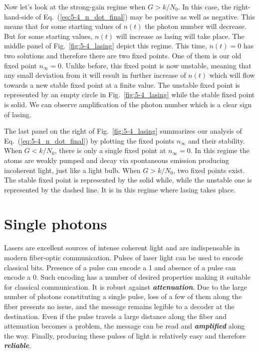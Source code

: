 Now let's look at the strong-gain regime when $G > k / N_0$.
In this case, the right-hand-side of Eq.~(\ref{eq:5-4_n_dot_final}) may be positive as well as negative.
This means that for some starting values of $n(t)$ the photon number will decrease.
But for some starting values, $n(t)$ will increase as lasing will take place.
The middle panel of Fig.~\ref{fig:5-4_lasing} depict this regime.
This time, $\dot{n}(t) = 0$ has two solutions and therefore there are two fixed points.
One of them is our old fixed point $n_{\infty} = 0$.
Unlike before, this fixed point is now unstable, meaning that any small deviation from it will result in further increase of $n(t)$ which will flow towards a new stable fixed point at a finite value.
The unstable fixed point is represented by an empty circle in Fig.~\ref{fig:5-4_lasing} while the stable fixed point is solid.
We can observe amplification of the photon number which is a clear sign of lasing.

The last panel on the right of Fig.~\ref{fig:5-4_lasing} summarizes our analysis of Eq.~(\ref{eq:5-4_n_dot_final}) by plotting the fixed points $n_{\infty}$ and their stability.
When $G < k / N_0$, there is only a single fixed point at $n_{\infty} = 0$.
In this regime the atoms are weakly pumped and decay via spontaneous emission producing incoherent light, just like a light bulb.
When $G > k / N_0$, two fixed points exist.
The stable fixed point is represented by the solid while, while the unstable one is represented by the dashed line.
It is in this regime where lasing takes place.


\section{Single photons}
\label{sec:5-5_single_photons}

Lasers are excellent sources of intense coherent light and are indispensable in modern fiber-optic communication.
Pulses of laser light can be used to encode classical bits.
Presence of a pulse can encode a 1 and absence of a pulse can encode a 0.
Such encoding has a number of desired properties making it suitable for classical communication.
It is robust against \textit{\textbf{attenuation}}.
Due to the large number of photons constituting a single pulse, loss of a few of them along the fiber presents no issue, and the message remains legible to a decoder at the destination.
Even if the pulse travels a large distance along the fiber and attenuation becomes a problem, the message can be read and \textit{\textbf{amplified}} along the way.
Finally, producing these pulses of light is relatively easy and therefore \textit{\textbf{reliable}}.


